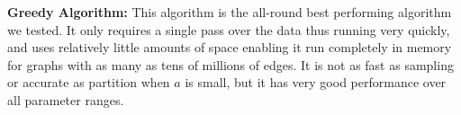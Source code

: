\textbf{Greedy Algorithm:} This algorithm is the all-round best performing algorithm we tested.
It only requires a single pass over the data thus running very quickly,  and uses
relatively little amounts of space enabling it run completely in memory for graphs with
as many as tens of millions of edges. It is not as fast as sampling or accurate as partition
when $a$ is small, but it has very good performance over all parameter ranges. 